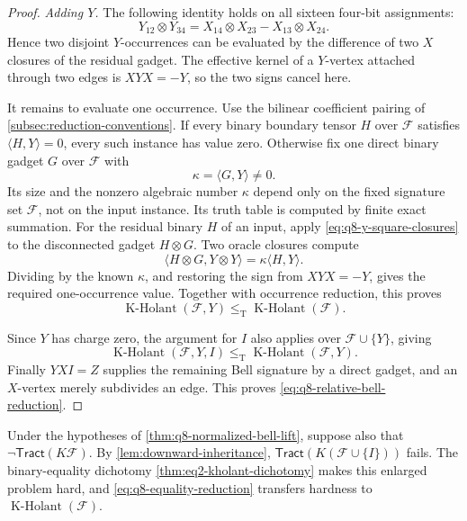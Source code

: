\documentclass[11pt,letterpaper,onecolumn]{article}
\theoremstyle{plain}
\theoremstyle{definition}
\theoremstyle{remark}
\newcommand{\cF}{\mathcal F}
\newcommand{\KHolant}{\operatorname{K\text{-}Holant}}
\newcommand{\Tract}{\mathsf{Tract}}
\newcommand{\leT}{\leq_{\mathrm T}}
\begin{document}
\begin{proof}
		\smallskip
		\noindent\emph{Adding \(Y\).}
		The following identity holds on all sixteen four-bit assignments:
		\begin{equation}
		Y_{12}\otimes Y_{34}
		=X_{14}\otimes X_{23}-X_{13}\otimes X_{24}.
		\label{eq:q8-y-square-closures}
		\end{equation}
		Hence two disjoint \(Y\)-occurrences can be evaluated by the difference
		of two \(X\) closures of the residual gadget.
		The effective kernel of a \(Y\)-vertex attached through two edges
		is \(XYX=-Y\), so the two signs cancel here.
		
		It remains to evaluate one occurrence. Use the bilinear coefficient pairing of
\cref{subsec:reduction-conventions}.  If every binary boundary tensor \(H\) over \(\cF\) satisfies
		\(\langle H,Y\rangle=0\), every such instance has value zero.
		Otherwise fix one direct binary gadget \(G\) over \(\cF\) with
		\[
		\kappa=\langle G,Y\rangle\ne0.
		\]
		Its size and the nonzero algebraic number \(\kappa\) depend only on the
		fixed signature set \(\cF\), not on the input instance. Its truth table is
		computed by finite exact summation.
		For the residual binary \(H\) of an input, apply
		\eqref{eq:q8-y-square-closures} to the disconnected gadget \(H\otimes G\).
		Two oracle closures compute
		\[
		\langle H\otimes G,Y\otimes Y\rangle
		=\kappa\langle H,Y\rangle.
		\]
		Dividing by the known \(\kappa\), and restoring the sign from \(XYX=-Y\),
		gives the required one-occurrence value.
		Together with occurrence reduction, this proves
		\begin{equation}
		\KHolant(\cF,Y)\leT\KHolant(\cF).
		\label{eq:auto-q8-33}
		\end{equation}
		

        Since \(Y\) has charge zero, the argument for \(I\) also applies
        over \(\cF\cup\{Y\}\), giving
		\begin{equation}
		\KHolant(\cF,Y,I)\leT\KHolant(\cF,Y).
		\label{eq:auto-q8-35}
		\end{equation}
		Finally \(YX I=Z\) supplies the remaining Bell signature by a direct
		gadget, and an \(X\)-vertex merely subdivides an edge.
		This proves \eqref{eq:q8-relative-bell-reduction}.
	\end{proof}

	Under the hypotheses of \cref{thm:q8-normalized-bell-lift}, suppose also
	that \(\neg\Tract(K\cF)\). By \cref{lem:downward-inheritance},
	\(\Tract(K(\cF\cup\{I\}))\) fails. The binary-equality dichotomy
    \cref{thm:eq2-kholant-dichotomy} makes this enlarged problem hard, and
    \eqref{eq:q8-equality-reduction} transfers hardness to \(\KHolant(\cF)\).
	
\end{document}
